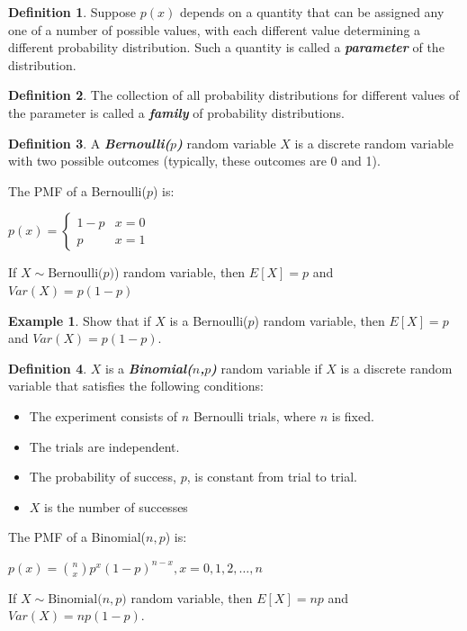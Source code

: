 \documentclass[
  11pt,
  oneside]{book}
\theoremstyle{definition}
\newtheorem{definition}{Definition}[chapter]
\theoremstyle{definition}
\newtheorem{example}{Example}[chapter]
\theoremstyle{definition}
\theoremstyle{definition}
\theoremstyle{remark}
\begin{document}
\begin{definition}
Suppose \(p(x)\) depends on a quantity that can be assigned any one of a number of possible values, with each different value determining a different probability distribution. Such a quantity is called a \textbf{\emph{parameter}} of the distribution.
\end{definition}

\begin{definition}
The collection of all probability distributions for different values of the parameter is called a \textbf{\emph{family}} of probability distributions.
\end{definition}

\begin{definition}
A \textbf{\emph{Bernoulli(\(p\))}} random variable \(X\) is a discrete random variable with two possible outcomes (typically, these outcomes are 0 and 1).

The PMF of a Bernoulli(\(p\)) is:

\begin{flushleft}
$p(x) = \begin{cases}
1-p & x=0\\
p & x=1
\end{cases}$
\end{flushleft}

If \(X \sim \text{Bernoulli(}p)\)) random variable, then \(E[X] = p\) and \(Var(X) = p(1-p)\)
\end{definition}

\begin{example}
Show that if \(X\) is a Bernoulli(\(p\)) random variable, then \(E[X] = p\) and \(Var(X) = p(1-p)\).
\end{example}

\vfill

\begin{definition}
\leavevmode

\(X\) is a \textbf{\emph{Binomial(\(n\),\(p\))}} random variable if \(X\) is a discrete random variable that satisfies the following conditions:

\begin{itemize}
\item The experiment consists of $n$ Bernoulli trials, where $n$ is fixed.
\item The trials are independent.
\item The probability of success, $p$, is constant from trial to trial.
\item $X$ is the number of successes
\end{itemize}

The PMF of a Binomial(\(n,p\)) is:

\(p(x) = \binom{n}{x} p^x (1-p)^{n-x}, x = 0, 1, 2, \ldots, n\)

If \(X \sim \text{Binomial(}n,p)\) random variable, then \(E[X] = np\) and \(Var(X) = np(1-p)\).

\end{definition}
\end{document}
